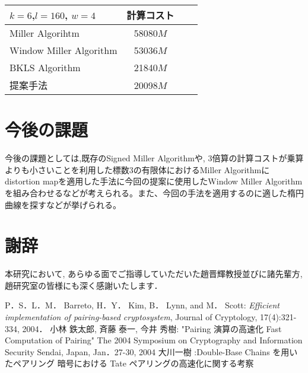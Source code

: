 \documentclass[twocolumn]{jsarticle} %
\begin{document}
\begin{table}[htbp]
 \begin{center}
  \begin{tabular}{|l|c|c|c|}
  \hline
  $k=6$,$l=160$, $w=4$ & 計算コスト \\
  \hline
  Miller Algorihtm & 58080$M$ \\
  \hline
  Window Miller Algorithm & 53036$M$ \\
  \hline
  BKLS Algorithm &  21840$M$ \\
  \hline
  提案手法 & 20098$M$ \\
  \hline
  \end{tabular}
 \end{center}
\end{table}
\vspace{-2.5zh}
\section{今後の課題}
今後の課題としては,既存のSigned Miller Algorithmや, 3倍算の計算コストが乗算よりも小さいことを利用した標数3の有限体におけるMiller Algorithmにdistortion mapを適用した手法に今回の提案に使用したWindow Miller Algorithmを組み合わせるなどが考えられる。また、今回の手法を適用するのに適した楕円曲線を探すなどが挙げられる。
\vspace{-1zh}
\section*{謝辞}
本研究において, あらゆる面でご指導していただいた趙晋輝教授並びに諸先輩方, 趙研究室の皆様にも深く感謝いたします．
\vspace{-1zh}
\begin{thebibliography}{99}
 P．S．L．M． Barreto, H．Y． Kim, B． Lynn, and M． Scott: {\em Efficient implementation of pairing-based cryptosystem}, Journal of Cryptology, 17(4):321-334, 2004．
 小林 鉄太郎, 斉藤 泰一, 今井 秀樹: "Pairing 演算の高速化 Fast Computation of Pairing" The 2004 Symposium on Cryptography and Information Security Sendai, Japan, Jan．27-30, 2004
大川一樹 :Double-Base Chains を用いたペアリング 暗号における Tate ペアリングの高速化に関する考察

\end{thebibliography}

\end{document}
